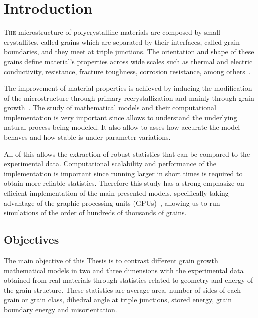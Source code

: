 \chapter{Introduction}
\label{chap:introduction}

\lettrine{T}{he} microstructure of polycrystalline materials are composed by small crystallites, called grains which are separated by their interfaces, called grain boundaries, and
they meet at triple junctions.
The orientation and shape of these grains define material's properties across wide scales such as thermal and electric conductivity, resistance, fracture toughness, corrosion resistance, among others~\cite{kinderlehrermultiscale, Kinderlehrer2006, Brons2013, torres2015}. 


The improvement of material properties is achieved by inducing the modification of the microstructure through primary recrystallization and mainly through grain growth~\cite{kinderlehrermultiscale, Kinderlehrer2006, Brons2013, torres2015, Piekos2004, pikekos2008stochastic, pikekos2008generalized, Orend2015}. 
The study of mathematical models and their computational implementation is very important since allows to understand the underlying natural process being modeled. 
It also allow to asses how accurate the model behaves and
how stable is under parameter variations.

All of this allows the extraction of robust statistics that can be compared to the experimental data. 
Computational scalability and performance of the implementation is important %
since running larger in short times is required to
obtain more reliable statistics. 
Therefore this study has a strong emphasize on efficient implementation of the main presented models, specifically taking advantage of the graphic processing units (GPUs)~\cite{nvidiacuda, Nickolls:2008:SPP:1365490.1365500}, allowing us to run simulations of the order of hundreds of thousands of grains.

\section{Objectives}
The main objective of this Thesis is to contrast different grain growth mathematical models in two and three dimensions with the experimental data obtained from real materials through statistics related to geometry and energy of the grain structure. 
These statistics are average area, number of sides of each grain or grain class, dihedral angle at triple junctions, stored energy, grain boundary energy and misorientation.


